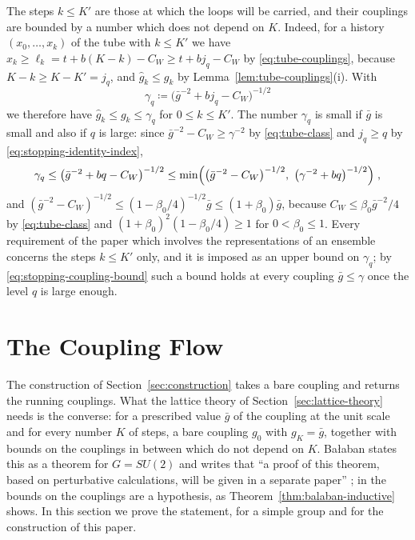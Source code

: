\documentclass[11pt]{preprint}
\numberwithin{equation}{section}
\theoremstyle{definition}
\theoremstyle{remark}
\theoremstyle{plain}
\begin{document}
The steps $k \leq K'$ are those at which the loops will be carried, and their couplings are bounded by a number which does not depend on $K$. Indeed, for a history $(x_0, \dots, x_k)$ of the tube with $k \leq K'$ we have $x_k \geq \ell_k = t + b(K - k) - C_W \geq t + bj_q - C_W$ by \eqref{eq:tube-couplings}, because $K - k \geq K - K' = j_q$, and $\hat g_k \leq g_k$ by Lemma~\ref{lem:tube-couplings}(i). With
\begin{equation}\label{eq:stopping-coupling}
    \gamma_q \coloneqq \bigl(\bar g^{-2} + bj_q - C_W\bigr)^{-1/2}
\end{equation}
we therefore have $\hat g_k \leq g_k \leq \gamma_q$ for $0 \leq k \leq K'$. The number $\gamma_q$ is small if $\bar g$ is small and also if $q$ is large: since $\bar g^{-2} - C_W \geq \gamma^{-2}$ by \eqref{eq:tube-class} and $j_q \geq q$ by \eqref{eq:stopping-identity-index},
\begin{equation}\label{eq:stopping-coupling-bound}
    \gamma_q \leq \bigl(\bar g^{-2} + bq - C_W\bigr)^{-1/2} \leq \min\Bigl(\bigl(\bar g^{-2} - C_W\bigr)^{-1/2},\ \bigl(\gamma^{-2} + bq\bigr)^{-1/2}\Bigr)\;,
\end{equation}
and $(\bar g^{-2} - C_W)^{-1/2} \leq (1 - \beta_0/4)^{-1/2}\bar g \leq (1 + \beta_0)\bar g$, because $C_W \leq \beta_0\bar g^{-2}/4$ by \eqref{eq:tube-class} and $(1 + \beta_0)^2(1 - \beta_0/4) \geq 1$ for $0 < \beta_0 \leq 1$. Every requirement of the paper which involves the representations of an ensemble concerns the steps $k \leq K'$ only, and it is imposed as an upper bound on $\gamma_q$; by \eqref{eq:stopping-coupling-bound} such a bound holds at every coupling $\bar g \leq \gamma$ once the level $q$ is large enough.

\section{The Coupling Flow}\label{sec:coupling-flow}

The construction of Section~\ref{sec:construction} takes a bare coupling and returns the running couplings. What the lattice theory of Section~\ref{sec:lattice-theory} needs is the converse: for a prescribed value $\bar g$ of the coupling at the unit scale and for every number $K$ of steps, a bare coupling $g_0$ with $g_K = \bar g$, together with bounds on the couplings in between which do not depend on $K$. Ba{\l}aban states this as a theorem for $G = SU(2)$ and writes that ``a proof of this theorem, based on perturbative calculations, will be given in a separate paper'' \cite[Theorem~2, p.~259]{BalabanRG1}; in \cite{BalabanCRE} the bounds on the couplings are a hypothesis, as Theorem~\ref{thm:balaban-inductive} shows. In this section we prove the statement, for a simple group and for the construction of this paper.
\end{document}
